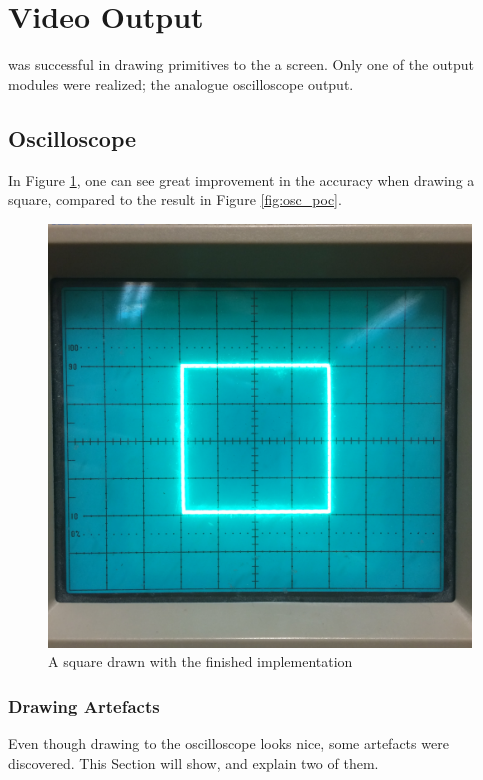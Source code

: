 \section{Video Output}
\vthreek was successful in drawing primitives to the a screen.
Only one of the output modules were realized; the analogue oscilloscope output.

\subsection{Oscilloscope}
In Figure \ref{fig:square}, one can see great improvement in the accuracy when drawing a square, compared to the result in Figure \ref{fig:osc_poc}.

\begin{figure}[h!]
	    \includegraphics[width=\linewidth]{images/square.jpg}
	    \caption{A square drawn with the finished implementation}
	    \label{fig:square}
\end{figure}


\subsubsection{Drawing Artefacts}
\label{results:artefacts}
Even though drawing to the oscilloscope looks nice, some artefacts were discovered.
This Section will show, and explain two of them.

